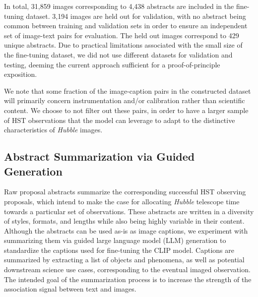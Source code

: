 \documentclass{article} %
\newcommand{\hubble}{\emph{Hubble}\xspace}
\newcommand{\changes}[1]{#1}
\begin{document}
   In total, 31,859 images corresponding to 4,438 abstracts are included in the fine-tuning dataset.
   3,194 images are held out for validation, with no abstract being common between training and validation sets in order to ensure an independent set of image-text pairs for evaluation. The held out images correspond to 429 unique abstracts.  %
   \changes{Due to practical limitations associated with the small size of the fine-tuning dataset, we did not use different datasets for validation and testing, deeming the current approach sufficient for a proof-of-principle exposition.}

   We note that some fraction of the image-caption pairs in the constructed dataset will primarily concern instrumentation and/or calibration rather than scientific content.
   We choose to not filter out these pairs, in order to have a larger sample of HST observations that the model can leverage to adapt to the distinctive characteristics of \hubble images.
   
   \subsection{Abstract Summarization via Guided Generation}
   \label{sec:summarization}
   
   Raw proposal abstracts summarize the corresponding successful HST observing proposals, which intend to make the case for allocating \hubble telescope time towards a particular set of observations.
   These abstracts are written in a diversity of styles, formats, and lengths while also being highly variable in their content.
   Although the abstracts can be used as-is as image captions, we experiment with summarizing them via guided large language model (LLM) generation to standardize the captions used for fine-tuning the CLIP model.
   Captions are summarized by extracting a list of objects and phenomena, as well as potential downstream science use cases, corresponding to the eventual imaged observation.
   The intended goal of the summarization process is to increase the strength of the association signal between text and images.
   
\end{document}
